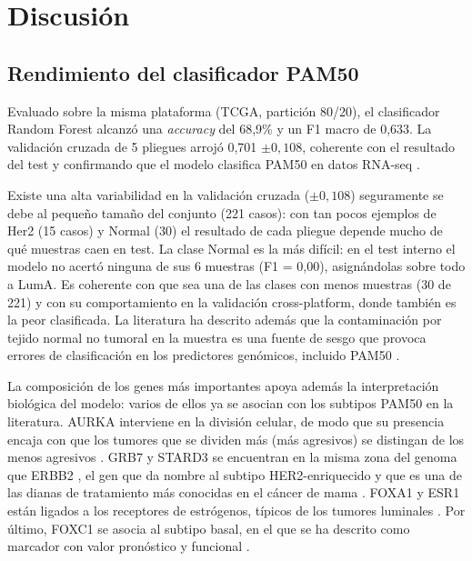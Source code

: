 \documentclass[12pt, a4paper]{report}
\begin{document}

\chapter{Discusión}

\section{Rendimiento del clasificador PAM50}

Evaluado sobre la misma plataforma (TCGA, partición 80/20), el clasificador Random Forest alcanzó una \textit{accuracy} del 68,9\% y un F1 macro de 0,633. La validación cruzada de 5 pliegues arrojó 0,701 $\pm 0,108$, coherente con el resultado del test y confirmando que el modelo clasifica PAM50 en datos RNA-seq \cite{sorlie_gene_2001}.

Existe una alta variabilidad en la validación cruzada ($\pm 0,108$) seguramente se debe al pequeño tamaño del conjunto (221 casos): con tan pocos ejemplos de Her2 (15 casos) y Normal (30) el resultado de cada pliegue depende mucho de qué muestras caen en test. La clase Normal es la más difícil: en el test interno el modelo no acertó ninguna de sus 6 muestras (F1 = 0,00), asignándolas sobre todo a LumA. Es coherente con que sea una de las clases con menos muestras (30 de 221) y con su comportamiento en la validación cross-platform, donde también es la peor clasificada. La literatura ha descrito además que la contaminación por tejido normal no tumoral en la muestra es una fuente de sesgo que provoca errores de clasificación en los predictores genómicos, incluido PAM50 \cite{elloumi_systematic_2011}.

La composición de los genes más importantes apoya además la interpretación biológica del modelo: varios de ellos ya se asocian con los subtipos PAM50 en la literatura. AURKA interviene en la división celular, de modo que su presencia encaja con que los tumores que se dividen más (más agresivos) se distingan de los menos agresivos \cite{ali_aurora_2012, sorlie_gene_2001, parker_supervised_2009}. GRB7 y STARD3 se encuentran en la misma zona del genoma que ERBB2 \cite{kauraniemi_erbb2_2001}, el gen que da nombre al subtipo HER2-enriquecido y que es una de las dianas de tratamiento más conocidas en el cáncer de mama \cite{slamon_human_1987}. FOXA1 y ESR1 están ligados a los receptores de estrógenos, típicos de los tumores luminales \cite{seachrist_foxa1_2021}. Por último, FOXC1 se asocia al subtipo basal, en el que se ha descrito como marcador con valor pronóstico y funcional \cite{ray_foxc1_2010}.
\end{document}
